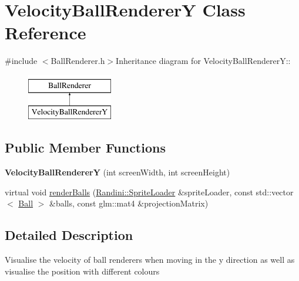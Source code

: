 \hypertarget{classVelocityBallRendererY}{
\section{VelocityBallRendererY Class Reference}
\label{classVelocityBallRendererY}
}


{\ttfamily \#include $<$BallRenderer.h$>$}Inheritance diagram for VelocityBallRendererY::\begin{figure}[H]
\begin{center}
\leavevmode
\includegraphics[height=2cm]{classVelocityBallRendererY}
\end{center}
\end{figure}
\subsection*{Public Member Functions}
\begin{DoxyCompactItemize}
\item 
\hypertarget{classVelocityBallRendererY_acbe922bfa2f2280299d9cb4a0d823395}{
{\bfseries VelocityBallRendererY} (int screenWidth, int screenHeight)}
\label{classVelocityBallRendererY_acbe922bfa2f2280299d9cb4a0d823395}

\item 
virtual void \hyperlink{classVelocityBallRendererY_aee5499c81382f071f58467d2040e36c9}{renderBalls} (\hyperlink{classRandini_1_1SpriteLoader}{Randini::SpriteLoader} \&spriteLoader, const std::vector$<$ \hyperlink{structBall}{Ball} $>$ \&balls, const glm::mat4 \&projectionMatrix)
\end{DoxyCompactItemize}


\subsection{Detailed Description}
Visualise the velocity of ball renderers when moving in the y direction as well as visualise the position with different colours 

